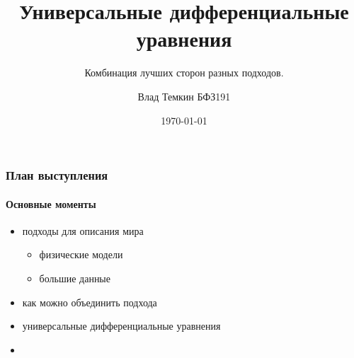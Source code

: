 \documentclass[10pt,pdf,hyperref={unicode}]{beamer}
\title{Универсальные дифференциальные уравнения}
\subtitle{Комбинация лучших сторон разных подходов.}
\author{Влад Темкин БФЗ191}
\date{\today}
\begin{document}
	
	\begin{frame}
		\titlepage
	\end{frame} 
	
	\begin{frame}
		\frametitle{План выступления} 
		\framesubtitle{Основные моменты}
			\begin{itemize}
				\item подходы для описания мира
				\begin{itemize}
					\item физические модели
					\item большие данные
				\end{itemize}
				\item как можно объединить подхода
				\item универсальные дифференциальные уравнения
				\item 
			\end{itemize}
	\end{frame}
\end{document}
